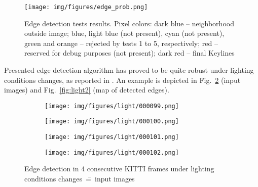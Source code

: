 \begin{figure}[ht]
	\centering\texttt{[image: img/figures/edge\_prob.png]}
	\caption{ Edge detection tests results. Pixel colors: dark blue -- neighborhood outside image; blue, light blue (not present), cyan (not present), green and orange -- rejected by tests 1 to 5, respectively; red -- reserved for debug purposes (not present); dark red -- final Keylines}
	\label{fig:edgeprob}
\end{figure}

Presented edge detection algorithm has proved to be quite robust under lighting conditions changes, as reported in \cite{jose2015realtime}. An example is depicted in Fig.~\ref{fig:light} (input images) and Fig.~\ref{fig:light2} (map of detected edges).

\begin{figure}[hp]
	\centering
	\begin{subfigure}{1\textwidth}
		\centering
		\centering\texttt{[image: img/figures/light/000099.png]}
		\subcaption{\label{fig:light_a}}
	\end{subfigure}
	\begin{subfigure}{1\textwidth}
		\centering
		\centering\texttt{[image: img/figures/light/000100.png]}
		\subcaption{\label{fig:light_b}}
	\end{subfigure}
	\begin{subfigure}{1\textwidth}
		\centering
		\centering\texttt{[image: img/figures/light/000101.png]}
		\subcaption{\label{fig:light_c}}
	\end{subfigure}
	\begin{subfigure}{1\textwidth}
		\centering
		\centering\texttt{[image: img/figures/light/000102.png]}
		\subcaption{\label{fig:light_d}}
	\end{subfigure}
	\caption{\label{fig:light} Edge detection in 4 consecutive KITTI \cite{kitti} frames under lighting conditions changes~\==~input images}
\end{figure}
		
